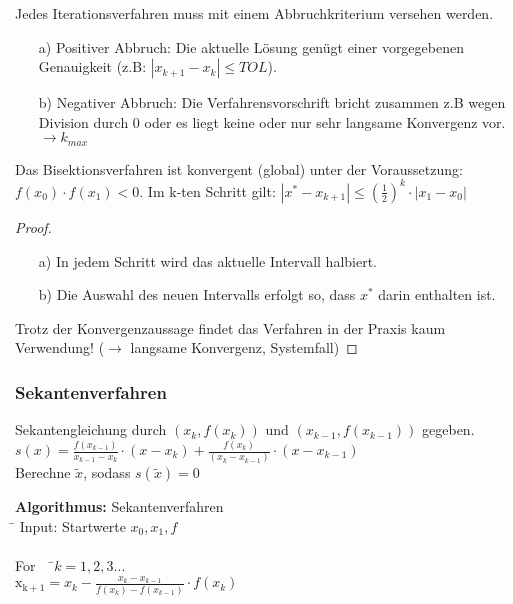 \begin{bemerkung}
Jedes Iterationsverfahren muss mit einem Abbruchkriterium versehen werden.
\end{bemerkung}


\begin{enumerate}
\item[a)] Positiver Abbruch: Die aktuelle Lösung genügt einer vorgegebenen Genauigkeit
      (z.B: $|x_{k+1}-x_k|\leq TOL$).
\item[b)] Negativer Abbruch: Die Verfahrensvorschrift bricht zusammen z.B wegen Division durch 0
      oder es liegt keine oder nur sehr langsame Konvergenz vor. $\rightarrow k_{max}$
\end{enumerate}

\begin{lemma}
Das Bisektionsverfahren ist konvergent (global) unter der Voraussetzung:
$f(x_0) \cdot f(x_1) <0$. Im k-ten Schritt gilt: $|x^*-x_{k+1}|\leq
(\frac{1}{2})^k \cdot |x_1-x_0|$ 
\end{lemma}

\begin{proof}
~
\begin{enumerate}
\item[a)] In jedem Schritt wird das aktuelle Intervall halbiert. 
\item[b)] Die Auswahl des neuen Intervalls erfolgt so, dass $x^*$ darin enthalten ist.
\end{enumerate}
Trotz der Konvergenzaussage findet das Verfahren in der Praxis kaum Verwendung! ($\rightarrow$ langsame Konvergenz, Systemfall)
\end{proof}

\subsubsection{Sekantenverfahren}

Sekantengleichung durch $(x_k, f(x_k))$ und $(x_{k-1}, f(x_{k-1}))$ gegeben.
\newline
\\$s(x)=\frac{f(x_{k-1})}{x_{k-1}-x_k} \cdot (x-x_k)+\frac{f(x_k)}{(x_k-x_{k-1})}\cdot (x-x_{k-1})$
\newline
\\Berechne $\tilde x$, sodass $s(\tilde x)=0$
\begin{tabbing}

\textbf{Algorithmus:} Sekantenverfahren\\
\= \kill
Input: Startwerte $x_0, x_1, f$\\
\newline
\\\> For \ \ \=$k=1,2,3...$\\ 
\> \> $\mathrm{x_{k+1}}= x_k - \frac{x_k-x_{k-1}}{f(x_k)-f(x_{k-1})} \cdot f(x_k)$ \\
\end{tabbing}

